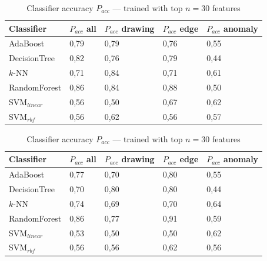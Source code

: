 \begin{table}[htb]
    \centering

    \begin{tabular}{l|C{2.5cm}|C{2.5cm}|C{2.5cm}|C{2.5cm}}
    \toprule
    Classifier & $P_{acc}$ all & $P_{acc}$ drawing & $P_{acc}$ edge & $P_{acc}$ anomaly \\
    \midrule
    AdaBoost & 0,79 & 0,79 & 0,76 & 0,55 \\
    DecisionTree & 0,82 & 0,76 & 0,79 & 0,44 \\
    $k$-NN & 0,71 & 0,84 & 0,71 & 0,61 \\
    RandomForest & 0,86 & 0,84 & 0,88 & 0,50 \\
    SVM$_{linear}$ & 0,56 & 0,50 & 0,67 & 0,62 \\
    SVM$_{rbf}$ & 0,56 & 0,62 & 0,56 & 0,57 \\
    \bottomrule
    \end{tabular}
    \caption{Classifier accuracy $P_{acc}$ --- trained with top $n=3$ features}
    \label{acc-1}
    
    \vspace{0.7cm}

    \begin{tabular}{l|C{2.5cm}|C{2.5cm}|C{2.5cm}|C{2.5cm}}
    \toprule
    Classifier & $P_{acc}$ all & $P_{acc}$ drawing & $P_{acc}$ edge & $P_{acc}$ anomaly \\
    \midrule
    AdaBoost & 0,77 & 0,70 & 0,80 & 0,55 \\
    DecisionTree & 0,70 & 0,80 & 0,80 & 0,44 \\
    $k$-NN & 0,74 & 0,69 & 0,70 & 0,64 \\
    RandomForest & 0,86 & 0,77 & 0,91 & 0,59 \\
    SVM$_{linear}$ & 0,53 & 0,50 & 0,50 & 0,62 \\
    SVM$_{rbf}$ & 0,56 & 0,56 & 0,62 & 0,56 \\
    \bottomrule
    \end{tabular}
    \caption{Classifier accuracy $P_{acc}$ --- trained with top $n=30$ features}
    \label{acc-2}

    \vspace{0.7cm}


\end{table}
